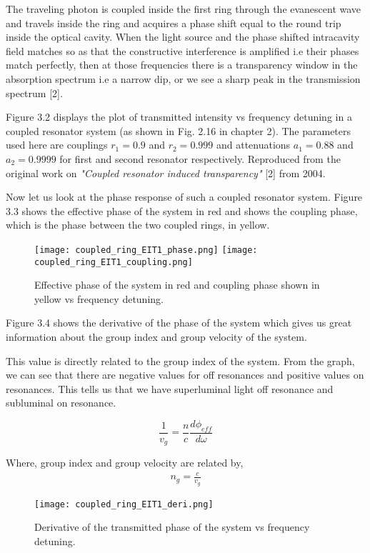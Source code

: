The traveling photon is coupled inside the first ring through the evanescent wave and travels inside the ring and acquires a phase shift equal to the round trip inside the optical cavity. When the light source and the phase shifted intracavity field matches so as that the constructive interference is amplified i.e their phases match perfectly, then at those frequencies there is a transparency window in the absorption spectrum i.e a narrow dip, or we see a sharp peak in the transmission spectrum [2].


Figure 3.2 displays the plot of transmitted intensity vs frequency detuning in a coupled resonator system (as shown in Fig. 2.16 in chapter 2). The parameters used here are couplings $r_{1} = 0.9$ and $r_{2} = 0.999$ and attenuations $a_{1} = 0.88$ and $a_{2} = 0.9999$ for first and second resonator respectively. Reproduced from the original work on \textit{"Coupled resonator induced transparency"} [2] from 2004.


Now let us look at the phase response of such a coupled resonator system. Figure 3.3 shows the effective phase of the system in red and shows the coupling phase, which is the phase between the two coupled rings, in yellow. 

\begin{figure}[h]
\texttt{[image: coupled\_ring\_EIT1\_phase.png]}
\texttt{[image: coupled\_ring\_EIT1\_coupling.png]}
\caption{Effective phase of the system in red and coupling phase shown in yellow vs frequency detuning.}
\end{figure}

Figure 3.4 shows the derivative of the phase of the system which gives us great information about the group index and group velocity of the system. 

This value is directly related to the group index of the system. From the graph, we can see that there are negative values for off resonances and positive values on resonances. This tells us that we have superluminal light off resonance and subluminal on resonance. 

\begin{equation}
\frac{1}{v_{g}} = \frac{n}{c} \frac{d\phi_{eff}}{d\omega}
\end{equation}

Where, group index and group velocity are related by, 
\begin{align*}
n_{g} = \frac{c}{v_{g}}
\end{align*}

\begin{figure}[h]
\centering
\texttt{[image: coupled\_ring\_EIT1\_deri.png]}
\caption{Derivative of the transmitted phase of the system vs frequency detuning.}
\end{figure}

